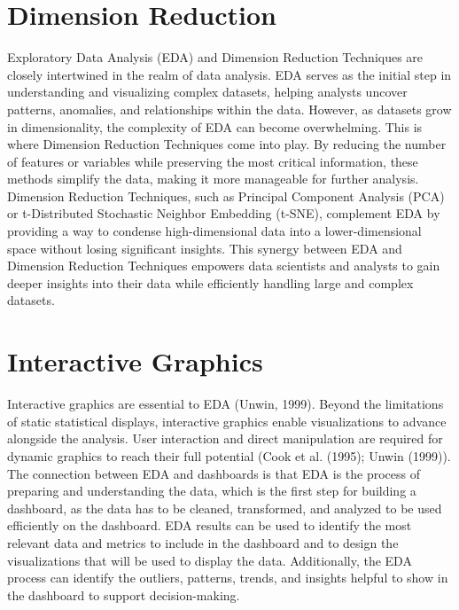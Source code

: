 \documentclass[print]{nuthesis}
\begin{document}
\hypertarget{dimension-reduction-1}{%
\section{Dimension Reduction}\label{dimension-reduction-1}}

Exploratory Data Analysis (EDA) and Dimension Reduction Techniques are closely intertwined in the realm of data analysis.
EDA serves as the initial step in understanding and visualizing complex datasets, helping analysts uncover patterns, anomalies, and relationships within the data.
However, as datasets grow in dimensionality, the complexity of EDA can become overwhelming. This is where Dimension Reduction Techniques come into play.
By reducing the number of features or variables while preserving the most critical information, these methods simplify the data, making it more manageable for further analysis.
Dimension Reduction Techniques, such as Principal Component Analysis (PCA) or t-Distributed Stochastic Neighbor Embedding (t-SNE), complement EDA by providing a way to condense high-dimensional data into a lower-dimensional space without losing significant insights.
This synergy between EDA and Dimension Reduction Techniques empowers data scientists and analysts to gain deeper insights into their data while efficiently handling large and complex datasets.

\hypertarget{interactive-graphics-1}{%
\section{Interactive Graphics}\label{interactive-graphics-1}}

Interactive graphics are essential to EDA (Unwin, 1999).
Beyond the limitations of static statistical displays, interactive graphics enable visualizations to advance alongside the analysis.
User interaction and direct manipulation are required for dynamic graphics to reach their full potential (Cook et al. (1995); Unwin (1999)).
The connection between EDA and dashboards is that EDA is the process of preparing and understanding the data, which is the first step for building a dashboard, as the data has to be cleaned, transformed, and analyzed to be used efficiently on the dashboard.
EDA results can be used to identify the most relevant data and metrics to include in the dashboard and to design the visualizations that will be used to display the data.
Additionally, the EDA process can identify the outliers, patterns, trends, and insights helpful to show in the dashboard to support decision-making.
\end{document}
